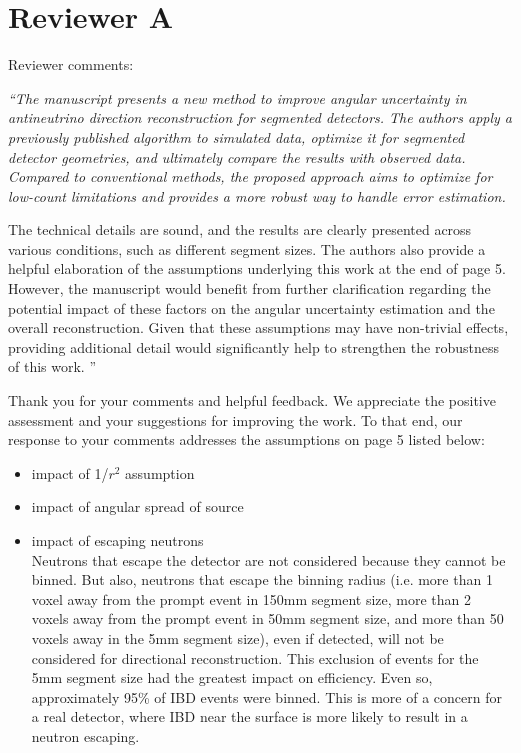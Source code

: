 \section{Reviewer A}

Reviewer comments:
{\it 
``The manuscript presents a new method to improve angular uncertainty in antineutrino direction reconstruction for segmented detectors. The authors apply a previously published algorithm to simulated data, optimize it for segmented detector geometries, and ultimately compare the results with observed data. Compared to conventional methods, the proposed approach aims to optimize for low-count limitations and provides a more robust way to handle error estimation.

The technical details are sound, and the results are clearly presented across various conditions, such as different segment sizes. The authors also provide a helpful elaboration of the assumptions underlying this work at the end of page 5. However, the manuscript would benefit from further clarification regarding the potential impact of these factors on the angular uncertainty estimation and the overall reconstruction. Given that these assumptions may have non-trivial effects, providing additional detail would significantly help to strengthen the robustness of this work.
''
}

Thank you for your comments and helpful feedback. We appreciate the positive assessment and your suggestions for improving the work. To that end, our response to your comments addresses the assumptions on page 5 listed below:

\begin{itemize}
    \item impact of 1/\(r^2\) assumption
    \item impact of angular spread of source
    \item impact of escaping neutrons \\ Neutrons that escape the detector are not considered because they cannot be binned. But also, neutrons that escape the binning radius (i.e. more than 1 voxel away from the prompt event in 150mm segment size, more than 2 voxels away from the prompt event in 50mm segment size, and more than 50 voxels away in the 5mm segment size), even if detected, will not be considered for directional reconstruction. This exclusion of events for the 5mm segment size had the greatest impact on efficiency. Even so, approximately 95\% of IBD events were binned. This is more of a concern for a real detector, where IBD near the surface is more likely to result in a neutron escaping. %
\end{itemize}

